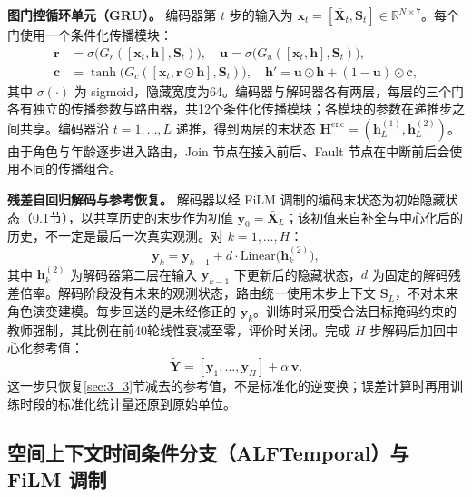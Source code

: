 \textbf{图门控循环单元（GRU）。} 编码器第 $t$ 步的输入为 $\mathbf{x}_t=[\bar{\mathbf{X}}_t,\mathbf{S}_t]\in\mathbb{R}^{N\times7}$。每个门使用一个条件化传播模块：
\begin{equation}\label{eq:7}
\begin{aligned}
\mathbf{r}&=\sigma\big(G_r([\mathbf{x}_t,\mathbf{h}],\mathbf{S}_t)\big),\quad
\mathbf{u}=\sigma\big(G_u([\mathbf{x}_t,\mathbf{h}],\mathbf{S}_t)\big),\\
\mathbf{c}&=\tanh\big(G_c([\mathbf{x}_t,\mathbf{r}\odot\mathbf{h}],\mathbf{S}_t)\big),\quad
\mathbf{h}'=\mathbf{u}\odot\mathbf{h}+(1-\mathbf{u})\odot\mathbf{c},
\end{aligned}
\end{equation}
其中 $\sigma(\cdot)$ 为 sigmoid，隐藏宽度为64。编码器与解码器各有两层，每层的三个门各有独立的传播参数与路由器，共12个条件化传播模块；各模块的参数在递推步之间共享。编码器沿 $t=1,\dots,L$ 递推，得到两层的末状态 $\mathbf{H}^{\mathrm{enc}}=(\mathbf{h}^{(1)}_L,\mathbf{h}^{(2)}_L)$。由于角色与年龄逐步进入路由，Join 节点在接入前后、Fault 节点在中断前后会使用不同的传播组合。

\textbf{残差自回归解码与参考恢复。} 解码器以经 FiLM 调制的编码末状态为初始隐藏状态（\ref{sec:3_5}节），以共享历史的末步作为初值 $\mathbf{y}_0=\bar{\mathbf{X}}_L$；该初值来自补全与中心化后的历史，不一定是最后一次真实观测。对 $k=1,\dots,H$：
\begin{equation}\label{eq:8}
\mathbf{y}_k=\mathbf{y}_{k-1}+d\cdot\mathrm{Linear}\big(\mathbf{h}^{(2)}_k\big),
\end{equation}
其中 $\mathbf{h}^{(2)}_k$ 为解码器第二层在输入 $\mathbf{y}_{k-1}$ 下更新后的隐藏状态，$d$ 为固定的解码残差倍率。解码阶段没有未来的观测状态，路由统一使用末步上下文 $\mathbf{S}_L$，不对未来角色演变建模。每步回送的是未经修正的 $\mathbf{y}_k$。训练时采用受合法目标掩码约束的教师强制，其比例在前40轮线性衰减至零，评价时关闭。完成 $H$ 步解码后加回中心化参考值：
\begin{equation}\label{eq:9}
\tilde{\mathbf{Y}}=[\mathbf{y}_1,\dots,\mathbf{y}_H]+\alpha\,\mathbf{v}.
\end{equation}
这一步只恢复\ref{sec:3_3}节减去的参考值，不是标准化的逆变换；误差计算时再用训练时段的标准化统计量还原到原始单位。

\subsection{空间上下文时间条件分支（ALFTemporal）与 FiLM 调制}\label{sec:3_5}

